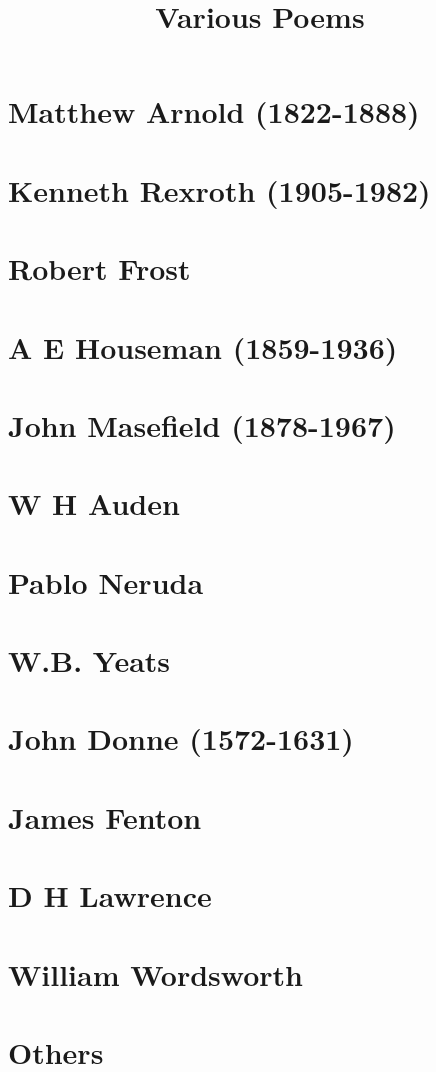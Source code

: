 \documentclass[a4paper,draft]{article}
\title{Various Poems}
\author{}
\date{}
\begin{document}
\maketitle

\section*{Matthew Arnold (1822-1888)} 


\section*{Kenneth Rexroth (1905-1982)} 


\section*{Robert Frost}


\section*{A E Houseman (1859-1936)}


\section*{John Masefield (1878-1967)}


\section*{W H Auden}


\section*{Pablo Neruda}


\section*{W.B. Yeats}


\section*{John Donne (1572-1631)}


\section*{James Fenton}


\section*{D H Lawrence}


\section*{William Wordsworth}


\section*{Others}

\end{document}
